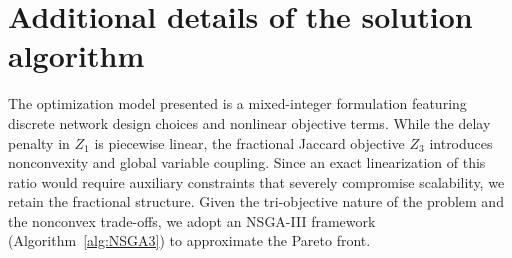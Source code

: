 \documentclass[a4paper,fleqn]{cas-sc}
\begin{document}


\section{Additional details of the solution algorithm}\label{sec:alg}
The optimization model presented  is a mixed-integer formulation featuring discrete network design choices and nonlinear objective terms. While the delay penalty in $Z_1$ is piecewise linear, the fractional Jaccard objective $Z_3$ introduces nonconvexity and global variable coupling. Since an exact linearization of this ratio would require auxiliary constraints that severely compromise scalability, we retain the fractional structure. Given the tri-objective nature of the problem and the nonconvex trade-offs, we adopt an NSGA-III framework (Algorithm~\ref{alg:NSGA3}) to approximate the Pareto front. 
\end{document}
